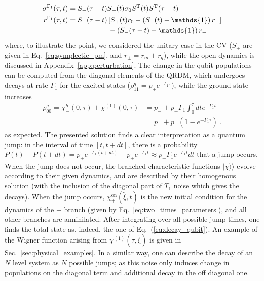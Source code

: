 \documentclass[%
reprint,
superscriptaddress,
nofootinbib,
 amsmath,amssymb,
prx,
floatfix,
]{revtex4-2}
\newcommand{\dket}[1]{\lvert #1 \rangle\!\rangle}
\begin{document}
\begin{align}
\label{eq:two_times_parameters}
    \sigma^{\Gamma_1} ( \tau, t) &= S_-(\tau - t) S_+(t) \sigma_0 S^{\rm T}_+(t) S^{\rm T}_-(\tau - t) \\
    \bar{r}^{\Gamma_1} ( \tau, t) &= S_-(\tau - t) \left[ S_+(t) r_0 - \left(  S_+(t) - \mathds{1} \right) r_+ \right] \nonumber \\
    &\hspace{2cm} - \left(  S_-(\tau - t) - \mathds{1} \right) r_-   \nonumber
\end{align}
where, to illustrate the point, we considered the unitary case in the CV ($S_{\pm}$ are given in Eq.~\ref{eq:symplectic_pm}, and $r_{\pm} = r_m \pm r_q$), while the open dynamics is discussed in Appendix~\ref{app:perturbation}. The change in the qubit populations can be computed from the diagonal elements of the QRDM, which undergoes decays at rate $\Gamma_1$ for the excited states ($\rho^q_{11} = p_+ e^{-\Gamma_1 \tau}$), while the ground state increases
\begin{align}
    \rho^q_{00} = \chi^{h}_- (0,\tau) + \chi^{(1)}(0,\tau) &  = p_- + p_+ \Gamma_1 \int_0^{\tau} dt e^{-\Gamma_1 t} \nonumber\\
    &= p_- + p_+ (1 - e^{-\Gamma_1 \tau}) \;. \nonumber
\end{align}
as expected. The presented solution finds a clear interpretation as a quantum jump: in the interval of time $[t, t + dt]$, there is a probability $P(t) - P(t+dt) = p_+  e^{-\Gamma_1 (t+dt)} - p_+  e^{-\Gamma_1 t} \approx p_+  \Gamma_1 e^{-\Gamma_1 t} dt $ that a jump occurs. When the jump does not occur, the branched characteristic functions $\dket{ \chi}$ evolve according to their given dynamics, and are described by their homogenous solution (with the inclusion of the diagonal part of $T_1$ noise which gives the decays). When the jump occurs, $\chi^{\text{on}}_+ (\tilde{\xi},t)$ is the new initial condition for the dynamics of the $-$ branch (given by Eq.~\ref{eq:two_times_parameters}), and all other branches are annihilated. After integrating over all possible jump times, one finds the total state as, indeed, the one of Eq.~(\ref{eq:decay_qubit}).  An example of the Wigner function arising from $\chi^{(1) } (\tau, \tilde{\xi})$ is given in Sec.~\ref{sec:physical_examples}. In a similar way, one can describe the decay of an $N$ level system as $N$ possible jumps; as this noise only induces change in populations on the diagonal term and additional decay in the off diagonal one.
\end{document}
